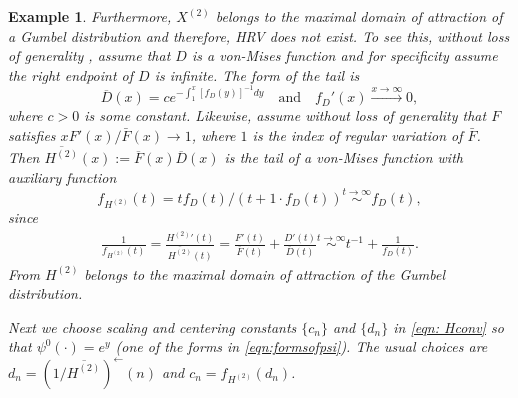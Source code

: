 \documentclass[11 pt]{amsart}
\newtheorem{ex}[thm]{Example}
\numberwithin{equation}{section}
\begin{document}
{\begin{ex}
{{Furthermore,  $X^{(2)}$ belongs to the maximal domain of
attraction of {a} Gumbel distribution and therefore,  HRV does not exist.
To see this,  without loss of generality
\citep{balkema:dehaan:1972, resnickbook:2008}, assume that $D$ is a
von-Mises function \citep[page 40]{resnickbook:2008} and for
specificity assume the right endpoint of $D$ is infinite. The form of
the tail is 
\begin{equation*}
\overline D (x) = c e^{- \int_1^x {\left[f_D(y) \right]}^{-1}dy} \quad
\text{and} \quad f_D'(x) \stackrel{x\to\infty}{\to} 0,
\end{equation*}
where $c>0$ is some constant. Likewise, assume without loss of generality
\citep[page 58]{resnickbook:2008} that $F$ satisfies $xF'(x)/\bar F(x)
\to 1$, where $1$ is the index of regular variation of $\bar F$.
Then  $\overline {H^{(2)}}(x) := \overline F(x) \overline D(x)$ is
{the tail of a} 
von-Mises function with auxiliary function  
\begin{equation*}
f_{H^{(2)}}(t) = tf_D(t)/(t + 1\cdot f_D(t)) \stackrel{t \to \infty}{\sim} f_D(t),
\end{equation*}
since
\begin{align*}
\frac1{f_{H^{(2)}}(t)} = \frac{{H^{(2)}}'(t)}{\overline {H^{(2)}}(t)} = \frac{F'(t)}{\overline F(t)} + \frac{D'(t)}{\overline D(t)} \stackrel{t \to \infty}{\sim}  t^{-1} + \frac1{f_D(t)}.
\end{align*}
From \cite[Corollary 1.7, page 46]{resnickbook:2008}  $H^{(2)}$
belongs to the maximal domain of attraction of {the} 
Gumbel
distribution.

Next we choose scaling and centering constants $\{ c_n \}$ and $\{ d_n
\}$ in \eqref{eqn: Hconv} so that $\psi^0(\cdot) = e^y$ (one of the
forms in \eqref{eqn:formsofpsi}). {The usual choices are \citep[page 40]{resnickbook:2008}}
$d_n ={ \left(1/{\overline {H^{(2)}}} \right)}^{\leftarrow}(n)$ and $c_n = f_{H^{(2)}}(d_n)$.

}}
\end{ex}}
\end{document}
